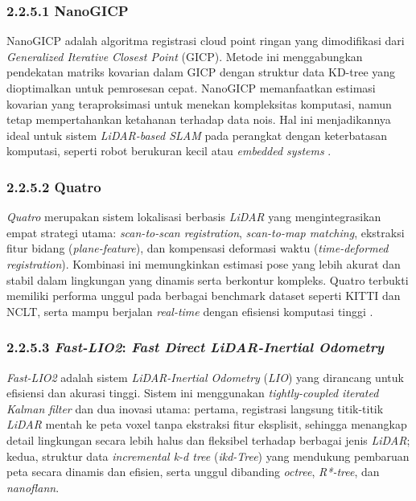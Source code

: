 \subsubsection{2.2.5.1 NanoGICP}

NanoGICP adalah algoritma registrasi cloud point ringan yang dimodifikasi dari \emph{Generalized Iterative Closest Point} (GICP). Metode ini menggabungkan pendekatan matriks kovarian dalam GICP dengan struktur data KD-tree yang dioptimalkan untuk pemrosesan cepat. NanoGICP memanfaatkan estimasi kovarian yang teraproksimasi untuk menekan kompleksitas komputasi, namun tetap mempertahankan ketahanan terhadap data nois. Hal ini menjadikannya ideal untuk sistem \emph{LiDAR-based SLAM} pada perangkat dengan keterbatasan komputasi, seperti robot berukuran kecil atau \emph{embedded systems} \cite{koide2021nanogicp}.


\subsubsection{2.2.5.2 Quatro}

\emph{Quatro} merupakan sistem lokalisasi berbasis \emph{LiDAR} yang mengintegrasikan empat strategi utama: \emph{scan-to-scan registration}, \emph{scan-to-map matching}, ekstraksi fitur bidang (\emph{plane-feature}), dan kompensasi deformasi waktu (\emph{time-deformed registration}). Kombinasi ini memungkinkan estimasi pose yang lebih akurat dan stabil dalam lingkungan yang dinamis serta berkontur kompleks. Quatro terbukti memiliki performa unggul pada berbagai benchmark dataset seperti KITTI dan NCLT, serta mampu berjalan \emph{real-time} dengan efisiensi komputasi tinggi \cite{kim2022quatro}.


\subsubsection{2.2.5.3 \emph{Fast-LIO2}: \emph{Fast Direct LiDAR-Inertial Odometry}}

\emph{Fast-LIO2} adalah sistem \emph{LiDAR-Inertial Odometry} (\emph{LIO}) yang dirancang untuk efisiensi dan akurasi tinggi. Sistem ini menggunakan \emph{tightly-coupled iterated Kalman filter} dan dua inovasi utama: pertama, registrasi langsung titik-titik \emph{LiDAR} mentah ke peta voxel tanpa ekstraksi fitur eksplisit, sehingga menangkap detail lingkungan secara lebih halus dan fleksibel terhadap berbagai jenis \emph{LiDAR}; kedua, struktur data \emph{incremental k-d tree} (\emph{ikd-Tree}) yang mendukung pembaruan peta secara dinamis dan efisien, serta unggul dibanding \emph{octree}, \emph{R*-tree}, dan \emph{nanoflann}.

